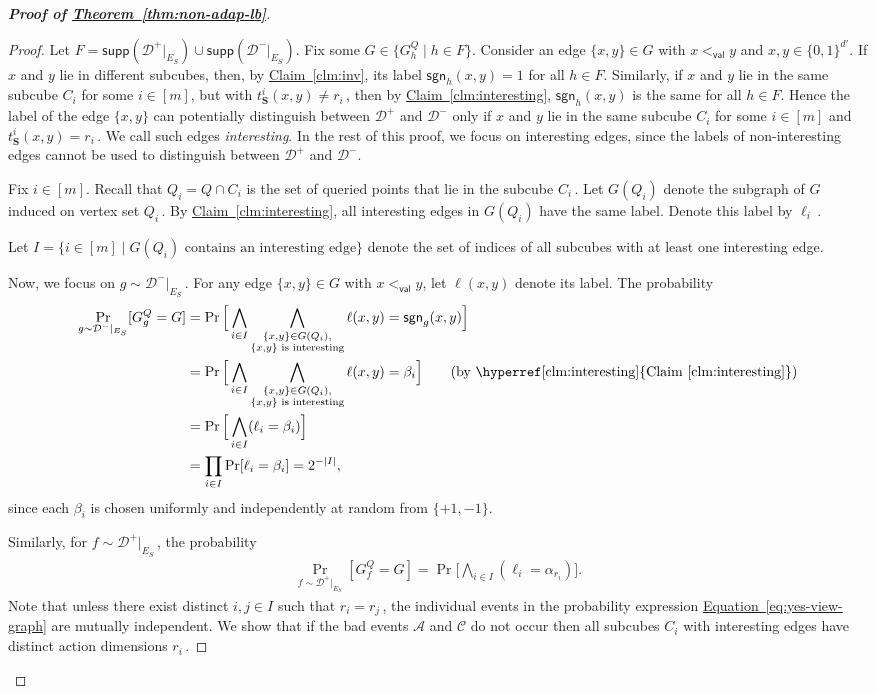 \documentclass[11pt]{article}
\numberwithin{equation}{section}
\theoremstyle{definition}
\theoremstyle{plain}
\newcommand{\expref}[2]{\hyperref[#2]{#1~\ref{#2}}}
\newcommand{\expeqref}[2]{\hyperref[#2]{#1~\eqref{#2}}}
\newcommand{\bS}{\ensuremath{\mathbf{S}}}
\newcommand{\cA}{\ensuremath{\mathcal{A}}}
\newcommand{\cC}{\ensuremath{\mathcal{C}}}
\newcommand{\hypercube}{\ensuremath{\{0,1\}^\dd}}
\newcommand{\Yes}{\ensuremath{\mathcal{D}^+}}
\newcommand{\No}{\ensuremath{\mathcal{D}^-}}
\newcommand{\order}{\ensuremath{<_\dec}}
\newcommand{\goodS}{\ensuremath{E_S}}
\newcommand{\coord}[2]{t^{#1}_{#2}}
\newcommand{\dd}{\ensuremath{{d'}}}
\newcommand{\dec}{\mathsf{val}}
\newcommand{\sgn}{\mathsf{sgn}}
\newcommand{\supp}{\mathsf{supp}}
\newcommand{\Thm}[1]{\expref{Theorem}{thm:#1}}
\newcommand{\Clm}[1]{\expref{Claim}{clm:#1}}
\begin{document}
\begin{proof}[{\bf Proof of \Thm{non-adap-lb}}]
\begin{proof}
Let $F = \supp(\Yes|_{\goodS}) \cup \supp(\No|_{\goodS})$.
Fix some $G \in \{ G^Q_h \mid h \in F \}$. Consider an edge $\{x,y\} \in G$ with $x \order y$ and $x,y \in \hypercube$.
If $x$ and $y$ lie in different subcubes, then, by \Clm{inv}, its label $\sgn_h(x, y) = 1$ for all $h \in F$. Similarly, if $x$ and $y$ lie in the same subcube $C_i$ for some $i \in [m]$, 
but with $\coord{i}{\bS}(x,y) \neq r_i$\,, %
then by \Clm{interesting}, $\sgn_h(x,y)$ is the same for all $h \in F$.
Hence the label of the edge $\{x,y\}$ can potentially distinguish between $\Yes$ and $\No$ only if $x$ and $y$ lie in the same subcube $C_i$ for some $i \in [m]$ and $\coord{i}{\bS}(x,y) = r_i$\,. %
We call such edges \emph{interesting}. In the rest of this proof, we focus on interesting edges, since the labels of non-interesting edges cannot be used to distinguish between $\Yes$ and $\No$.

Fix $i \in [m]$. Recall that $Q_i = Q \cap C_i$  is the set of queried points that lie in the subcube $C_i$\,. %
Let $G(Q_i)$ denote the subgraph of $G$ induced on vertex set $Q_i$\,. %
By \Clm{interesting}, all interesting edges in $G(Q_i)$ have the same label. 
Denote this label by $\ell_i$\,. %

Let $I = \{ i \in [m] \mid G(Q_i) \text{ contains an interesting edge}\}$ denote the set of indices of all subcubes with at least one interesting edge.

Now, we focus on $g \sim \No|_{\goodS}$\,. %
For any edge $\{x,y\} \in G$ with $x \order y$, let $\ell(x,y)$ denote its label. The probability
\begin{align}
\Pr\limits_{g \sim \No|_{\goodS}}[G^Q_g = G] &= \Pr \Big[ \bigwedge_{i \in I} \bigwedge_{\substack{\{x,y\} \in G(Q_i), \\ \{x, y \} \text{ is interesting}}} \ell(x,y) = \sgn_g (x,y) \Big] \notag \\
&= \Pr \Big[ \bigwedge_{i \in I} \bigwedge_{\substack{\{x,y\} \in G(Q_i), \\ \{x, y \} \text{ is interesting}}} \ell(x,y) = \beta_i \Big] \tag*{(by \Clm{interesting})} \\
&= \Pr \Big[ \bigwedge_{i \in I}  (\ell_i = \beta_i) \Big] \notag \\
&= \prod\limits_{i \in I}\Pr[\ell_i = \beta_i] = 2^{-|I|}, \label{eq:no-view-graph}
\end{align}
since each $\beta_i$ is chosen uniformly and independently at random from $\{+1, -1\}$.
%

%
%
Similarly,
for $f \sim \Yes|_{\goodS}$\,, 
%
the probability
\begin{align}
\Pr\limits_{f \sim \Yes|_{\goodS}}[G^Q_f = G] = \Pr \Big[ \bigwedge_{i \in I}  (\ell_i = \alpha_{r_i}) \Big]. \label{eq:yes-view-graph}
\end{align}
Note that unless there exist distinct $i,j \in I$ 
such that $r_i = r_j$\,, %
the individual events in the probability expression \expeqref{Equation}{eq:yes-view-graph} are mutually independent.
We show that if the bad events $\cA$ and $\cC$ do not occur then all subcubes $C_i$ with interesting edges 
have distinct action dimensions $r_i$\,. %


\end{proof}
\end{proof}
\end{document}
